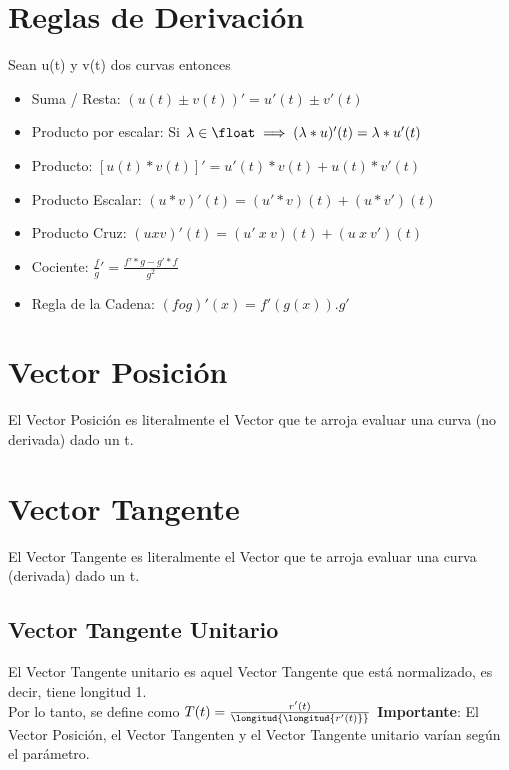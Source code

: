 \documentclass[10pt,a4paper]{article}
\begin{document}
\section*{Reglas de Derivación}
Sean u(t) y v(t) dos curvas entonces 
\begin{itemize}
    \item Suma / Resta: $(u(t) \pm v(t))' = u'(t) \pm v'(t)$
    \item Producto por escalar: Si $\lambda \in \float \implies (\lambda * u)'(t) = \lambda * u'(t)$
    \item Producto: $[u(t) * v(t)]' = u'(t) * v(t) + u(t) * v'(t)$
    \item Producto Escalar: $(u * v)'(t) = (u'*v)(t) + (u * v')(t)$
    \item Producto Cruz: $(u x v)'(t) = (u' \ x \ v)(t) + (u \ x \ v')(t) $
    \item Cociente: $\frac{f}{g}' = \frac{f' * g - g' * f}{g^{2}}$
    \item Regla de la Cadena: $ (f o g)'(x) = f'(g(x)) . g'$
\end{itemize}
\section*{Vector Posición}
El Vector Posición es literalmente el Vector que te arroja evaluar una curva (no derivada) dado un t. 
\section*{Vector Tangente}
El Vector Tangente es literalmente el Vector que te arroja evaluar una curva (derivada) dado un t. 
\subsection*{Vector Tangente Unitario}
El Vector Tangente unitario es aquel Vector Tangente que está normalizado, es decir, tiene longitud 1. \\
Por lo tanto, se define como $T(t) = \frac{r'(t)}{\longitud{\longitud{r'(t)}}}$
\textbf{Importante}: El Vector Posición, el Vector Tangenten y el Vector Tangente unitario varían según el parámetro. 
\end{document}
